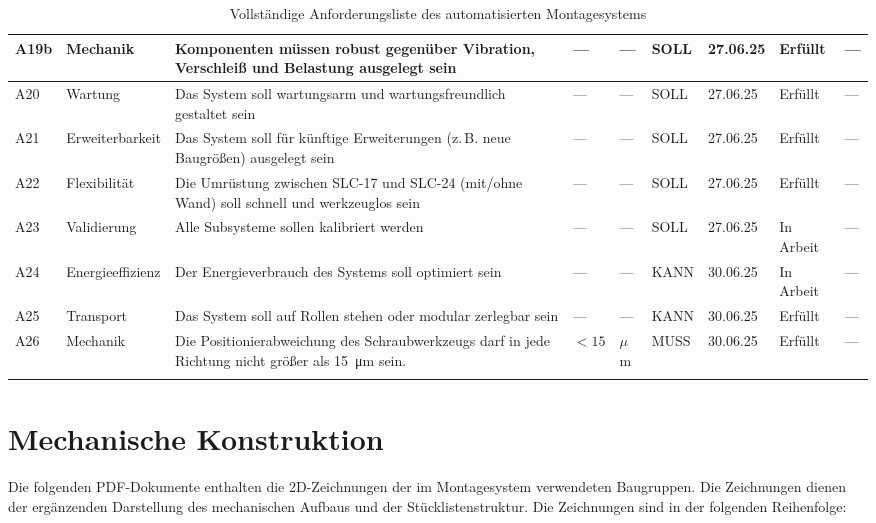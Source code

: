 \begin{landscape}
\begin{longtable}{|l|p{}|p{8.5cm}|l|l|l|l|l|p{4.0cm}|}
A19b & Mechanik &
Komponenten müssen robust gegenüber Vibration, Verschleiß und Belastung ausgelegt sein &
— & — & SOLL & 27.06.25 & Erfüllt &
— \\
\hline

A20 & Wartung &
Das System soll wartungsarm und wartungsfreundlich gestaltet sein &
— & — & SOLL & 27.06.25 & Erfüllt &
— \\
\hline

A21 & Erweiter\-barkeit &
Das System soll für künftige Erweiterungen (z.\,B. neue Baugrößen) ausgelegt sein &
— & — & SOLL & 27.06.25 & Erfüllt &
— \\
\hline

A22 & Flexibilität &
Die Umrüstung zwischen SLC-17 und SLC-24 (mit/ohne Wand) soll schnell und werkzeuglos sein &
— & — & SOLL & 27.06.25 & Erfüllt &
— \\
\hline

A23 & Validierung &
Alle Subsysteme sollen kalibriert werden &
— & — & SOLL & 27.06.25 & In Arbeit &
— \\
\hline

A24 & Energie\-effizienz &
Der Energieverbrauch des Systems soll optimiert sein &
— & — & KANN & 30.06.25 & In Arbeit &
— \\
\hline

A25 & Transport &
Das System soll auf Rollen stehen oder modular zerlegbar sein &
— & — & KANN & 30.06.25 & Erfüllt &
— \\
\hline

A26 & Mechanik &
Die Positionierabweichung des Schraubwerkzeugs
darf in jede Richtung nicht größer als \qty{15}{\micro\meter} sein. &
$< 15$ & $\mu$m & MUSS & 30.06.25 & Erfüllt &
— \\
\hline

\caption{Vollständige Anforderungsliste des automatisierten Montagesystems}
\label{tab:anforderungsliste}
\end{longtable}
\end{landscape}

\clearpage

\section{Mechanische Konstruktion}
\label{anhang:2d_zeichnungen}

Die folgenden PDF-Dokumente enthalten die 2D-Zeichnungen der im Montagesystem
verwendeten Baugruppen. Die Zeichnungen dienen der ergänzenden Darstellung
des mechanischen Aufbaus und der Stücklistenstruktur. Die Zeichnungen sind in der folgenden Reihenfolge:

